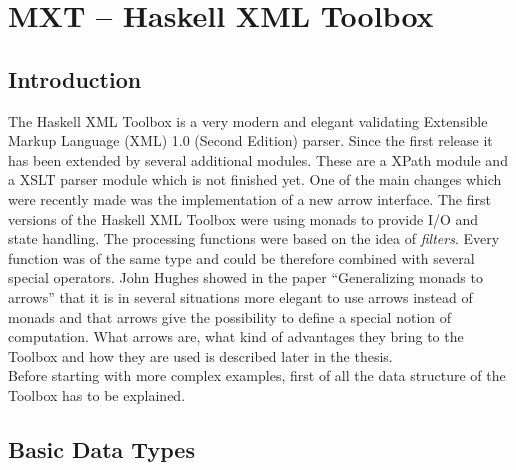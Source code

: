 \documentclass[11pt,a4paper,headsepline, bibtotoc]{scrreprt}
\begin{document}
\chapter{MXT -- Haskell XML Toolbox}
\section{Introduction}

The Haskell XML Toolbox is a very modern and elegant validating Extensible Markup Language (XML) 1.0 (Second Edition) \cite{XML} parser. Since the first release it has been extended by several additional modules. These are a XPath module and a XSLT parser module which is not finished yet. One of the main changes which were recently made was the implementation of a new arrow interface. The first versions of the Haskell XML Toolbox were using monads to provide I/O and state handling. The processing functions were based on the idea of \textit{filters}. Every function was of the same type and could be therefore combined with several special operators. John Hughes showed in the paper ``Generalizing monads to arrows'' \cite{H:2000} that it is in several situations more elegant to use arrows instead of monads and that arrows give the possibility to define a special notion of computation. What arrows are, what kind of advantages they bring to the Toolbox and how they are used is described later in the thesis.\\
Before starting with more complex examples, first of all the data structure of the Toolbox has to be explained.
\section{Basic Data Types}
\end{document}
